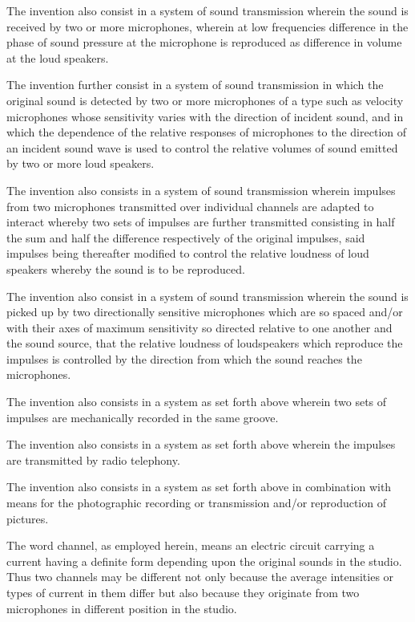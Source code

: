 \documentclass[11pt]{article}
\begin{document}
\begin{multicols*}{2}
The invention also consist in a system of sound transmission wherein the sound is received by two or more microphones, wherein at low frequencies difference in the phase of sound pressure at the microphone is reproduced as difference in volume at the loud speakers.

The invention further consist in a system of sound transmission in which the original sound is detected by two or more microphones of a type such as velocity microphones whose sensitivity varies with the direction of incident sound, and in which the dependence of the relative responses of microphones to the direction of an incident sound wave is used to control the relative volumes of sound emitted by two or more loud speakers.

The invention also consists in a system of sound transmission wherein impulses from two microphones transmitted over individual channels are adapted to interact whereby two sets of impulses are further transmitted consisting in half the sum and half the difference respectively of the original impulses, said impulses being thereafter modified to control the relative loudness of loud speakers whereby the sound is to be reproduced.

The invention also consist in a system of sound transmission wherein the sound is picked up by two directionally sensitive microphones which are so spaced and/or with their axes of maximum sensitivity so directed relative to one another and the sound source, that the relative loudness of loudspeakers which reproduce the impulses is controlled by the direction from which the sound reaches the microphones.

The invention also consists in a system as set forth above wherein two sets of impulses are mechanically recorded in the same groove.

The invention also consists in a system as set forth above wherein the impulses are transmitted by radio telephony.

The invention also consists in a system as set forth above in combination with means for the photographic recording or transmission and/or reproduction of pictures.

The word channel, as employed herein, means an electric circuit carrying a current having a definite form depending upon the original sounds in the studio. Thus two channels may be different not only because the average intensities or types of current in them differ but also because they originate from two microphones in different position in the studio.


\end{multicols*}
\end{document}
